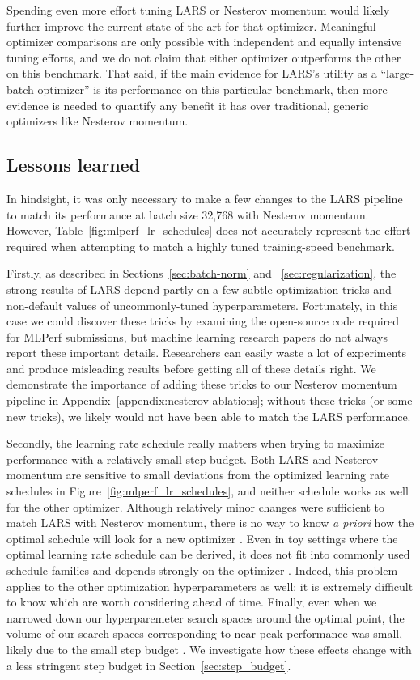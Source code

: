 \documentclass{article}
\begin{document}
Spending even more effort tuning LARS or Nesterov momentum would likely further improve the current state-of-the-art for that optimizer. Meaningful optimizer comparisons are only possible with independent and equally intensive tuning efforts, and we do not claim that either optimizer outperforms the other on this benchmark.
That said, if the main evidence for LARS's utility as a ``large-batch optimizer'' is its performance on this particular benchmark, then more evidence is needed to quantify any benefit it has over traditional, generic optimizers like Nesterov momentum. 

\subsection{Lessons learned}

In hindsight, it was only necessary to make a few changes to the LARS pipeline to match its performance at batch size 32,768 with Nesterov momentum. However, Table~\ref{fig:mlperf_lr_schedules} does not accurately represent the effort required when attempting to match a highly tuned training-speed benchmark.

Firstly, as described in Sections~\ref{sec:batch-norm} and ~\ref{sec:regularization}, the strong results of LARS depend partly on a few subtle optimization tricks and non-default values of uncommonly-tuned hyperparameters. Fortunately, in this case we could discover these tricks by examining the open-source code required for MLPerf submissions, but machine learning research papers do not always report these important details. Researchers can easily waste a lot of experiments and produce misleading results before getting all of these details right.
We demonstrate the importance of adding these tricks to our Nesterov momentum pipeline in Appendix~\ref{appendix:nesterov-ablations}; without these tricks (or some new tricks), we likely would not have been able to match the LARS performance.

Secondly, the learning rate schedule really matters when trying to maximize performance with a relatively small step budget. Both LARS and Nesterov momentum are sensitive to small deviations from the optimized learning rate schedules in Figure~\ref{fig:mlperf_lr_schedules}, and neither schedule works as well for the other optimizer. Although relatively minor changes were sufficient to match LARS with Nesterov momentum, there is no way to know \textit{a priori} how the optimal schedule will look for a new optimizer \cite{wu2018understanding}. Even in toy settings where the optimal learning rate schedule can be derived, it does not fit into commonly used schedule families and depends strongly on the optimizer \cite{zhang2019algorithmic}. 
Indeed, this problem applies to the other optimization hyperparameters as well: it is extremely difficult to know which are worth considering ahead of time.
Finally, even when we narrowed down our hyperparemeter search spaces around the optimal point, the volume of our search spaces corresponding to near-peak performance was small, likely due to the small step budget \citep{shallue2019measuring}. We investigate how these effects change with a less stringent step budget in Section~\ref{sec:step_budget}.
 
\end{document}
